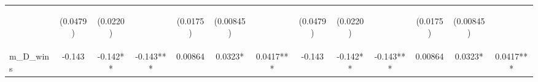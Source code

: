 \documentclass[]{article}
\begin{document}
\begin{center}
\begin{tabular}{lcccccccccccc}
\vspace{4pt} & \begin{footnotesize}(0.0479)\end{footnotesize} & \begin{footnotesize}(0.0220)\end{footnotesize} & \begin{footnotesize}\end{footnotesize} & \begin{footnotesize}(0.0175)\end{footnotesize} & \begin{footnotesize}(0.00845)\end{footnotesize} & \begin{footnotesize}\end{footnotesize} & \begin{footnotesize}(0.0479)\end{footnotesize} & \begin{footnotesize}(0.0220)\end{footnotesize} & \begin{footnotesize}\end{footnotesize} & \begin{footnotesize}(0.0175)\end{footnotesize} & \begin{footnotesize}(0.00845)\end{footnotesize} & \begin{footnotesize}\end{footnotesize} \\
m\_D\_wins & -0.143 & -0.142** & -0.143*** & 0.00864 & 0.0323* & 0.0417*** & -0.143 & -0.142** & -0.143*** & 0.00864 & 0.0323* & 0.0417*** \\

\end{tabular}
\end{center}
\end{document}
